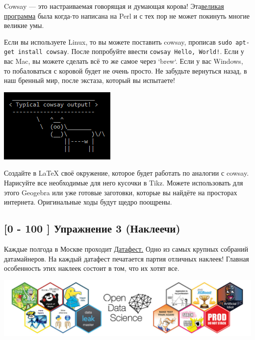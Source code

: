 \documentclass[12pt, a4paper, oneside]{article}
\begin{document}
Cowsay — это настраиваемая говорящая и думающая корова! Эта\href{http://citkit.ru/articles/679/}{великая программа} была когда-то написана на Perl и с тех пор не может покинуть многие великие умы.

Если вы используете Linux, то вы можете поставить cowsay, прописав \texttt{sudo apt-get install cowsay}. После попробуйте ввести \texttt{cowsay Hello, World!}. Если у вас Mac, вы можете сделать всё то же самое через `brew`. Если у вас Windows, то побаловаться с коровой будет не очень просто. Не забудьте вернуться назад, в наш бренный мир, после экстаза, который вы испытаете!

\begin{center}
\includegraphics[scale=1]{Cowsay_Typical_Output.png}
\end{center}

Создайте в LaTeX своё окружение, которое будет работать по аналогии с cowsay. Нарисуйте все необходимые для него кусочки в Tikz. Можете использовать для этого Geogebra или уже готовые заготовки, которые вы найдёте на просторах интернета. Оригинальные ходы будут щедро поощрены.

\subsection*{[0 - 100 ]  Упражнение 3  (Наклеечи)}

Каждые полгода в Москве проходит \href{http://datafest.ru/}{Датафест.} Одно из самых крупных собраний датамайнеров. На каждый датафест печатается партия отличных наклеек! Главная особенность этих наклеек состоит в том, что их хотят все.

\begin{center}
	\includegraphics[scale=0.35]{DF.jpg}
\end{center}
\end{document}
